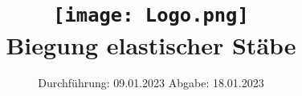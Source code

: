 

\subject{V103}
\title{\texttt{[image: Logo.png]}\\
Biegung elastischer Stäbe}
\date{%
  Durchführung: 09.01.2023
  \hspace{3em}
  Abgabe: 18.01.2023
}



\maketitle
\thispagestyle{empty}
\tableofcontents
\newpage







\printbibliography{}


